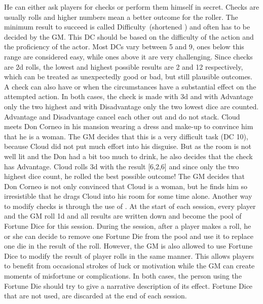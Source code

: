 He can either ask players for checks or perform them himself in secret.
Checks are usually  rolls and higher numbers mean a better outcome for the roller. 
The minimum result to succeed is called Difficulty~(shortened ) and often has to be decided by the GM.
This DC should be based on the difficulty of the action and the proficiency of the actor.
Most DCs vary between 5 and 9, ones below this range are considered easy, while ones above it are very challenging.
%
\ofpar
%
Since checks are 2d rolls, the lowest and highest possible results are 2 and 12 respectively, which can be treated as unexpectedly good or bad, but still plausible outcomes.
A check can also have  or  when the circumstances have a substantial effect on the attempted action. 
In both cases, the check is made with 3d and with Advantage only the two highest and with Disadvantage only the two lowest dice are counted. 
Advantage and Disadvantage cancel each other out and do not stack.
%
\clearpage
%
{
	Cloud meets Don Corneo in his mansion wearing a dress and make-up to convince him that he is a woman.
	The GM decides that this is a very difficult task (DC 10), because Cloud did not put much effort into his disguise. 
	But as the room is not well lit and the Don had a bit too much to drink, he also decides that the check has Advantage. 
	Cloud rolls 3d with the result [6,2,6] and since only the two highest dice count, he rolled the best possible outcome! 
	The GM decides that Don Corneo is not only convinced that Cloud is a woman, but he finds him so irresistible that he drags Cloud into his room for some time alone.
}
%
\ofpar
%
Another way to modify checks is through the use of .
At the start of each session, every player and the GM roll 1d and all results are written down and become the pool of Fortune Dice for this session.
During the session, after a player makes a roll, he or she can decide to remove one Fortune Die from the pool and use it to replace one die in the result of the roll.
However, the GM is also allowed to use Fortune Dice to modify the result of player rolls in the same manner.
This allows players to benefit from occasional strokes of luck or motivation while the GM can create moments of misfortune or complications.
In both cases, the person using the Fortune Die should try to give a narrative description of its effect.
Fortune Dice that are not used, are discarded at the end of each session.
%
\ofpar
%
